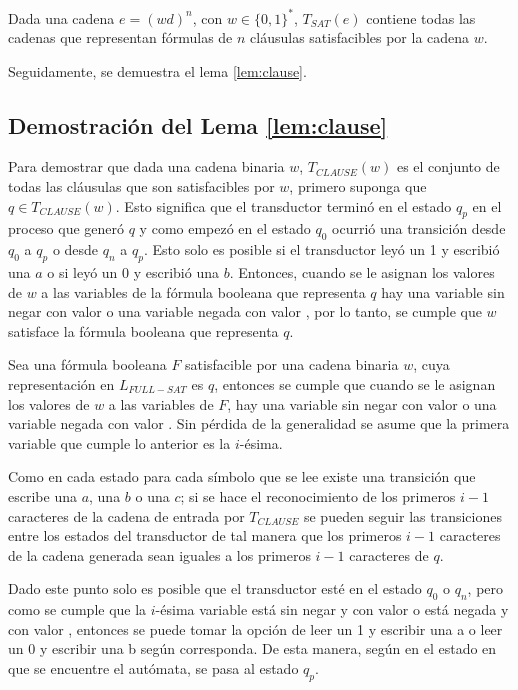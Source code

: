 \begin{lemma}
    \label{lem:sat}
    Dada una cadena $e=(wd)^n$, con $w\in\{0,1\}^*$, $T_{SAT}(e)$ contiene todas las cadenas que representan fórmulas de $n$ cláusulas satisfacibles por la cadena $w$.
\end{lemma}


Seguidamente, se demuestra el lema \ref{lem:clause}.

\subsection{Demostración del Lema \ref{lem:clause}}

Para demostrar que dada una cadena binaria $w$, $T_{CLAUSE}(w)$ es el conjunto de todas las cláusulas que son 
satisfacibles por $w$, primero suponga que $q\in T_{CLAUSE}(w)$.  Esto significa que el transductor terminó en 
el estado $q_p$ en el proceso que generó $q$ y como empezó en el estado $q_0$ ocurrió una transición desde 
$q_0$ a $q_p$ o desde $q_n$ a $q_p$. Esto solo es posible si el transductor leyó un 1 y escribió una $a$ o si leyó un 0 y 
escribió una $b$. Entonces, cuando se le asignan los valores de $w$ a las variables de la fórmula booleana que 
representa $q$ hay una variable sin negar con valor \true{} o una variable negada con valor \false{}, por lo tanto, 
se cumple que $w$ satisface la fórmula booleana que representa $q$.

Sea una fórmula booleana $F$ satisfacible por una cadena binaria $w$, cuya representación en $L_{FULL-SAT}$ es $q$, entonces se cumple que 
cuando se le asignan los valores de $w$ a las variables de $F$, hay una variable sin negar con valor \true{} o una variable negada con valor \false{}. Sin pérdida de la generalidad se asume que la primera variable que cumple 
lo anterior es la $i$-ésima.  

Como en cada estado para cada símbolo que se lee existe una transición que escribe una $a$, una $b$ o una $c$;
si se hace el reconocimiento de los primeros $i-1$ caracteres de la cadena de entrada por $T_{CLAUSE}$
se pueden seguir las transiciones entre los estados del transductor de tal manera que los primeros $i-1$
caracteres de la cadena generada sean iguales a los primeros $i-1$ caracteres de $q$. 

Dado este punto solo es posible que el transductor esté en el estado $q_0$ o $q_n$, pero como se cumple que la $i$-ésima variable está sin negar y con valor \true{} o está negada y con valor \false{}, entonces se puede tomar la opción de leer un 1 y escribir una a o leer un 0 y escribir una b según corresponda.  De esta manera, según en el estado en que se encuentre el autómata, se pasa al estado $q_p$.

